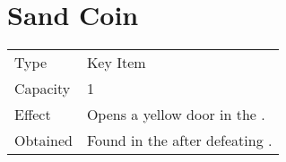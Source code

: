 \section{Sand Coin}
\label{item:sand_coin}


\noindent\begin{tabularx}{\textwidth}[l]{lX}
	Type
	& Key Item
\\
	Capacity
	& 1
\\
	Effect
	& Opens a yellow door in the \nameref{map:focus_tower}.
\\
	Obtained
	& Found in the \nameref{map:bone_dungeon} after defeating \nameref{monster:flamerus_rex}.
\end{tabularx}
